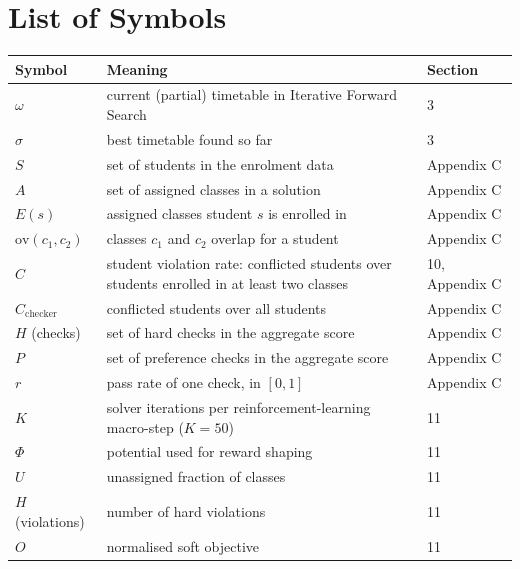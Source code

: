 \chapter*{List of Symbols}

\begin{center}
\begin{tabular}{@{}l p{8.2cm} l@{}}
\toprule
Symbol & Meaning & Section \\
\midrule
$\omega$ & current (partial) timetable in Iterative Forward Search & 3 \\
$\sigma$ & best timetable found so far & 3 \\
$S$ & set of students in the enrolment data & Appendix C \\
$A$ & set of assigned classes in a solution & Appendix C \\
$E(s)$ & assigned classes student $s$ is enrolled in & Appendix C \\
$\mathrm{ov}(c_1,c_2)$ & classes $c_1$ and $c_2$ overlap for a student & Appendix C \\
$C$ & student violation rate: conflicted students over students enrolled in at least two classes & 10, Appendix C \\
$C_{\mathrm{checker}}$ & conflicted students over all students & Appendix C \\
$H$ (checks) & set of hard checks in the aggregate score & Appendix C \\
$P$ & set of preference checks in the aggregate score & Appendix C \\
$r$ & pass rate of one check, in $[0,1]$ & Appendix C \\
$K$ & solver iterations per reinforcement-learning macro-step ($K=50$) & 11 \\
$\Phi$ & potential used for reward shaping & 11 \\
$U$ & unassigned fraction of classes & 11 \\
$H$ (violations) & number of hard violations & 11 \\
$O$ & normalised soft objective & 11 \\
\bottomrule
\end{tabular}
\end{center}
